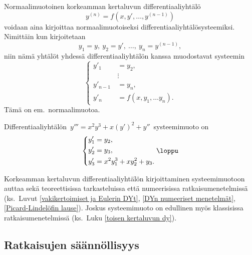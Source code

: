 Normaalimuotoinen korkeamman kertaluvun differentiaaliyhtälö
\[
y^{(n)}=f(x,y',\ldots,y^{(n-1)})
\]
voidaan aina kirjoittaa normaalimuotoiseksi differentiaaliyhtälösysteemiksi. Nimittäin kun 
kirjoitetaan
\[
y_1=y,\ y_2=y',\ \ldots,\ y_n=y^{(n-1)},
\]
niin nämä yhtälöt yhdessä differentiaaliyhtälön kanssa muodostavat systeemin
\[
 \left\{ \begin{aligned} 
         y'_1 \quad  &= y_2, \\
                     &\vdots \\
         y'_{n-1}\,  &= y_n, \\
         y'_n \quad  &= f(x,y_1, \ldots y_n).
         \end{aligned} \right.
\]
Tämä on em.\ normaalimuotoa.
\begin{Exa} Differentiaaliyhtälön $\,y'''=x^2y^3+x(y')^2+y''\,$ systeemimuoto on
\[
 \left\{ \begin{aligned} 
         y'_1 &= y_2, \\
         y'_2 &= y_3, \\
         y'_3 &= x^2y_1^3+xy_2^2+y_3.
         \end{aligned} \right. \loppu
\]
\end{Exa}

Korkeamman kertaluvun differentiaaliyhtälön kirjoittaminen systeemimuotoon auttaa sekä 
teoreettisissa tarkasteluissa että numeerisissa ratkaisumenetelmissä (ks.\ Luvut 
\ref{vakikertoimiset ja Eulerin DYt}, \ref{DYn numeeriset menetelmät},
\ref{Picard-Lindelöfin lause}). Joskus systeemimuoto on edullinen myös klassisissa
ratkaisumenetelmissä (ks.\ Luku \ref{toisen kertaluvun dy}).

\subsection{Ratkaisujen säännöllisyys}

